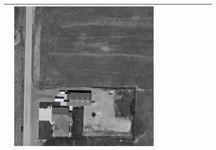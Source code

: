 \begin{figure}[h!]
\begin{tabularx}{\textwidth}{c|*{9}{X}}
    & \includegraphics[trim={300pt 355pt 610pt 570pt},clip,width=\linewidth]{images/015Results/03ablation/comp_images/green/198.png} \\ \hline


\end{tabularx}
\end{figure}
